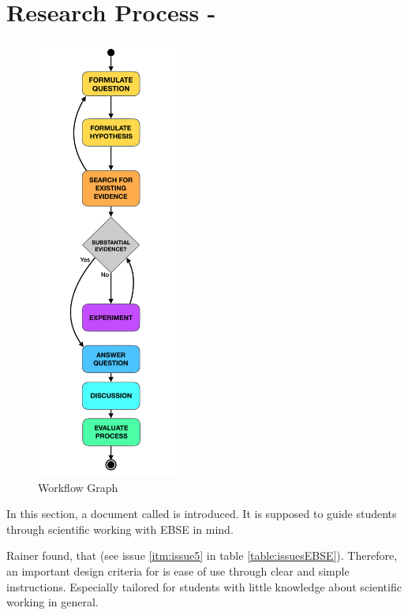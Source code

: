 
\section{Research Process - \checklist}
\label{sec:research process}

\begin{minipage}{\linewidth}
\begin{figure}
	\centering
	\vspace{-1.0cm}
	\includegraphics[trim={3cm 0 3cm 0}, height=14.55cm]{figures/workflow_graph.pdf}
	\caption{Workflow Graph}
	\label{fig:workflow_graph}
\end{figure}



In this section, a document called \emph{\checklist} is introduced. It is supposed to guide students through scientific working with EBSE in mind.

Rainer \etal found, that  \cite{Rainer2006} (see issue \ref{itm:issue5} in table \ref{table:issuesEBSE}). Therefore, an important design criteria for \checklist is ease of use through clear and simple instructions. Especially tailored for students with little knowledge about scientific working in general.


\end{minipage}
